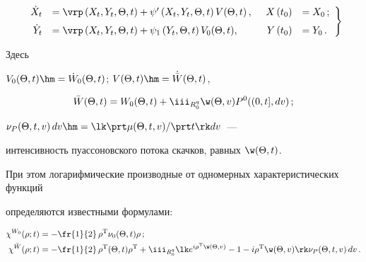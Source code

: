 \begin{equation}

\left.

\begin{array}{rlrl}

\dot X_t &=\vrp \left(X_t, Y_t, \Theta, t\right)+\psi' 

\left(X_t, Y_t, \Theta, t\right)V(\Theta, t)\,, &\enskip 

X\left(t_0\right)&=X_0\,;\\[6pt]

\dot Y_t &= \vrp\left(X_t, Y_t, \Theta, t\right)+\psi_1 \left(Y_t, \Theta, t\right) 

V_0 (\Theta, t),&\enskip Y\left(t_0\right) &= Y_0\,. %

\end{array}

\right\}

\label{e2.19-s1}

\end{equation}

Здесь

$V_0 (\Theta, t) \hm=\dot W_0 (\Theta, t)$; $V (\Theta, t)\hm=\dot{\bar W}  (\Theta, t)$,

\begin{equation*}

    \bar W (\Theta, t) = W_0  (\Theta, t)+ 

    \iii_{R_0^q} \w (\Theta, v) P^0 ((0,t],dv)\,;


    \end{equation*}

$\nu_P  (\Theta, t,v)\, dv\hm= \lk \prt \mu  (\Theta, t,v)/\prt t\rk dv$~--- 

интенсивность пуассоновского потока скачков, равных $\w (\Theta, t)$.

При этом логарифмические производные от одномерных характеристических функций 

определяются известными формулами:

    \begin{align*}

    \chi^{W_0} (\rho; t) &= -\fr{1}{2}\, \rho^{\mathrm{T}} \nu_0  (\Theta, t) \rho\,;

\\

    \chi^{\bar W} (\rho;t) &= - \fr{1}{2}\, \rho^{\mathrm{T}}  (\Theta, t) \rho^{\mathrm{T}}+ 

    \iii_{R_0^q} \lk e^{i\rho^{\mathrm{T}} \w (\Theta, v)} -1- i\rho^{\mathrm{T}} \w (\Theta, v)\rk \nu_P 

     (\Theta, t,v)\,dv\,.

     \end{align*}

